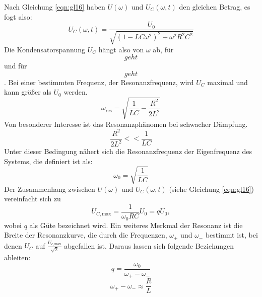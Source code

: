 Nach Gleichung \eqref{eqn:gl16} haben $U(\omega)$ und $U_C(\omega,t)$ den gleichen Betrag, es fogt also:
\begin{equation}
  U_C(\omega,t) = \frac{U_0}{\sqrt{(1 - LC\omega^2)^2 + \omega^2 R^2 C^2}}
  \label{eqn:gl19}
\end{equation}
Die Kondensatorspannung $U_C$ hängt also von $\omega$ ab, für $$ geht $$ und für $$ geht $$.
Bei einer bestimmten Frequenz, der Resonanzfrequenz, wird $U_C$ maximal und kann größer als $U_0$ werden.
\begin{equation}
  \omega_{\text{res}} = \sqrt{\frac{1}{LC} - \frac{R^2}{2L^2}}
  \label{eqn:gl20}
\end{equation}
Von besonderer Interesse ist das Resonanzphänomen bei schwacher Dämpfung.
\begin{equation*}
  \frac{R^2}{2L^2} << \frac{1}{LC}
\end{equation*}
Unter dieser Bedingung nähert sich die Resonanzfrequenz der Eigenfrequenz des Systems, die definiert ist als:
\begin{equation}
  \omega_0 = \sqrt{\frac{1}{LC}}
  \label{eqn:gl21}
\end{equation}
Der Zusammenhang zwischen $U(\omega)$ und $U_C(\omega,t)$ (siehe Gleichung \eqref{eqn:gl16}) vereinfacht sich zu
\begin{equation}
  U_{C,\text{max}} = \frac{1}{\omega_0 RC}U_0 = qU_0,
  \label{eqn:gl22}
\end{equation}
wobei $q$ als Güte bezeichnet wird.
Ein weiteres Merkmal der Resonanz ist die Breite der Resonanzkurve, die durch die Frequenzen, $\omega_+$ und $\omega_-$ bestimmt ist, bei denen $U_C$ auf $\frac{U_{c,\text{max}}}{\sqrt{2}}$ abgefallen ist.
Daraus lassen sich folgende Beziehungen ableiten:
\begin{equation}
  q = \frac{\omega_0}{\omega_+ - \omega_-}
  \label{eqn:gl23}
\end{equation}
\begin{equation}
  \omega_+ - \omega_- \approx \frac{R}{L}
  \label{eqn:gl24}
\end{equation}